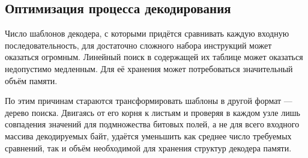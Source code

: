 \subsection{Оптимизация процесса декодирования}

Число шаблонов декодера, с которыми придётся сравнивать каждую входную последовательность, для достаточно сложного набора инструкций может оказаться огромным. Линейный поиск в содержащей их таблице может оказаться недопустимо медленным. Для её хранения может потребоваться значительный объём памяти.

По этим причинам стараются трансформировать шаблоны в другой формат --- дерево поиска. Двигаясь от его корня к листьям и проверяя в каждом узле лишь совпадения значений для подмножества битовых полей, а не для всего входного массива декодируемых байт, удаётся уменьшить как среднее число требуемых сравнений, так и объём необходимой для хранения структур декодера памяти.

% 
% 
%         
%         

